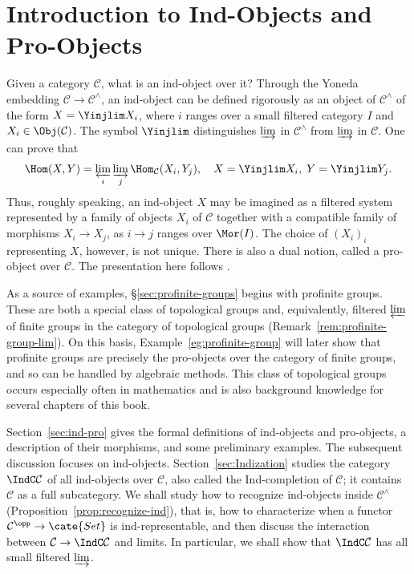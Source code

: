 
\chapter{Introduction to Ind-Objects and Pro-Objects}\label{sec:app-Ind}
Given a category $\mathcal{C}$, what is an ind-object over it? Through the Yoneda embedding $\mathcal{C}\to\mathcal{C}^{\wedge}$, an ind-object can be defined rigorously as an object of $\mathcal{C}^\wedge$ of the form $X=\Yinjlim X_i$, where $i$ ranges over a small filtered category $I$ and $X_i\in\Obj(\mathcal{C})$. The symbol $\Yinjlim$ distinguishes $\varinjlim$ in $\mathcal{C}^{\wedge}$ from $\varinjlim$ in $\mathcal{C}$. One can prove that
\[ \Hom(X, Y) = \varprojlim_i \varinjlim_j \Hom_{\mathcal{C}}(X_i, Y_j), \quad X = \Yinjlim X_i, \; Y = \Yinjlim Y_j. \]
Thus, roughly speaking, an ind-object $X$ may be imagined as a filtered system represented by a family of objects $X_i$ of $\mathcal{C}$ together with a compatible family of morphisms $X_i\to X_j$, as $i\to j$ ranges over $\Mor(I)$. The choice of $(X_i)_i$ representing $X$, however, is not unique. There is also a dual notion, called a pro-object over $\mathcal{C}$. The presentation here follows \cite{KS06}.

As a source of examples, \S\ref{sec:profinite-groups} begins with profinite groups. These are both a special class of topological groups and, equivalently, filtered $\varprojlim$ of finite groups in the category of topological groups (Remark~\ref{rem:profinite-group-lim}). On this basis, Example~\ref{eg:profinite-group} will later show that profinite groups are precisely the pro-objects over the category of finite groups, and so can be handled by algebraic methods. This class of topological groups occurs especially often in mathematics and is also background knowledge for several chapters of this book.

Section~\ref{sec:ind-pro} gives the formal definitions of ind-objects and pro-objects, a description of their morphisms, and some preliminary examples. The subsequent discussion focuses on ind-objects. Section~\ref{sec:Indization} studies the category $\IndC\mathcal{C}$ of all ind-objects over $\mathcal{C}$, also called the Ind-completion of $\mathcal{C}$; it contains $\mathcal{C}$ as a full subcategory. We shall study how to recognize ind-objects inside $\mathcal{C}^{\wedge}$ (Proposition~\ref{prop:recognize-ind}), that is, how to characterize when a functor $\mathcal{C}^{\opp}\to\cate{Set}$ is ind-representable, and then discuss the interaction between $\mathcal{C}\to\IndC\mathcal{C}$ and limits. In particular, we shall show that $\IndC\mathcal{C}$ has all small filtered $\varinjlim$.

